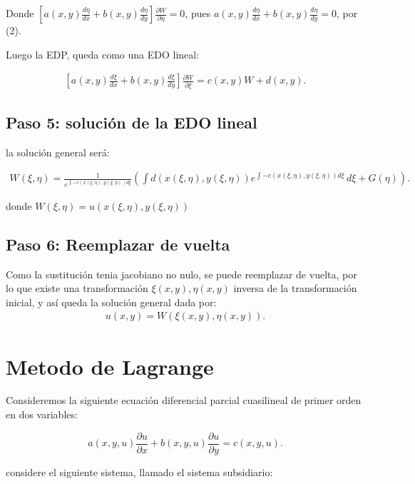\documentclass[11pt]{book}
\theoremstyle{plain}
\theoremstyle{definition}
\begin{document}
Donde $\left[a(x, y)\frac{d\eta}{dx} + b(x, y)\frac{d\eta}{dy}\right]\frac{\partial W}{\partial \eta} = 0$, pues
$a(x, y)\frac{d\eta}{dx} + b(x, y)\frac{d\eta}{dy} = 0$, por (2).

Luego la EDP, queda como una EDO lineal:

\begin{align}
\left[a(x, y)\frac{d\xi}{dx} + b(x, y)\frac{d\xi}{dy}\right]\frac{\partial W}{\partial \xi} = c(x, y)W + d(x, y).
\end{align}

\subsection*{Paso 5: solución de la EDO lineal}
la solución general será:

\begin{align}
W(\xi , \eta) = \frac{1}{e ^{\int -c(x(\xi , \eta), y(\xi , \eta))d\xi}} \left(\int d(x(\xi , \eta), y(\xi , \eta)) e ^{\int -c(x(\xi , \eta), y(\xi , \eta))d\xi} \, d\xi + G(\eta)\right).
\end{align}

donde $W(\xi , \eta) = u(x(\xi , \eta), y(\xi , \eta))$

\subsection*{Paso 6: Reemplazar de vuelta}
Como la sustitución tenia jacobiano no nulo, se puede reemplazar de vuelta, por lo que existe una transformación $\xi(x, y) , \eta(x,y)$ inversa de la transformación inicial, y así queda la solución general dada por:
\begin{align}
    u(x, y) = W(\xi(x, y) , \eta(x, y)).
\end{align}

\newpage
\section{Metodo de Lagrange}
Consideremos la siguiente ecuación diferencial parcial cuasilineal de primer orden en dos variables:

\setcounter{equation}{0}
\begin{equation}
a(x, y, u) \frac{\partial u}{\partial x} + b(x, y, u) \frac{\partial u}{\partial y} = c(x, y, u).
\end{equation}

considere el siguiente sistema, llamado el sistema subsidiario:
\end{document}
